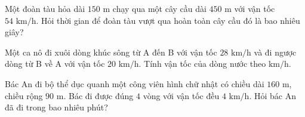 \begin{ex} %
Một đoàn tàu hỏa dài $150\text{ m}$ chạy qua một cây cầu dài $450\text{ m}$ với vận tốc $54\text{ km/h}$. Hỏi thời gian để đoàn tàu vượt qua hoàn toàn cây cầu đó là bao nhiêu giây?
\end{ex}

\begin{ex} %
Một ca nô đi xuôi dòng khúc sông từ A đến B với vận tốc $28\text{ km/h}$ và đi ngược dòng từ B về A với vận tốc $20\text{ km/h}$. Tính vận tốc của dòng nước theo $\text{km/h}$.
\end{ex}

\begin{ex} %
Bác An đi bộ thể dục quanh một công viên hình chữ nhật có chiều dài $160\text{ m}$, chiều rộng $90\text{ m}$. Bác đi được đúng $4$ vòng với vận tốc đều $4\text{ km/h}$. Hỏi bác An đã đi trong bao nhiêu phút?
\end{ex}
